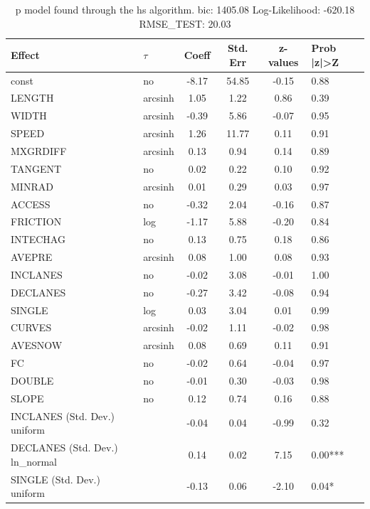 \begin{table}
	\caption{p model found through the hs algorithm. bic: 1405.08 Log-Likelihood: -620.18 RMSE_TEST: 20.03}
	\begin{center}
		\begin{tabular}{|l|l|c|c|c|l|}
			\hline
			Effect & $\tau$ & Coeff & Std. Err & z-values & Prob |z|>Z \\
			\hline
			const & no & -8.17 & 54.85 & -0.15 & 0.88 \\
			\hline
			LENGTH & arcsinh & 1.05 & 1.22 & 0.86 & 0.39 \\
			\hline
			WIDTH & arcsinh & -0.39 & 5.86 & -0.07 & 0.95 \\
			\hline
			SPEED & arcsinh & 1.26 & 11.77 & 0.11 & 0.91 \\
			\hline
			MXGRDIFF & arcsinh & 0.13 & 0.94 & 0.14 & 0.89 \\
			\hline
			TANGENT & no & 0.02 & 0.22 & 0.10 & 0.92 \\
			\hline
			MINRAD & arcsinh & 0.01 & 0.29 & 0.03 & 0.97 \\
			\hline
			ACCESS & no & -0.32 & 2.04 & -0.16 & 0.87 \\
			\hline
			FRICTION & log & -1.17 & 5.88 & -0.20 & 0.84 \\
			\hline
			INTECHAG & no & 0.13 & 0.75 & 0.18 & 0.86 \\
			\hline
			AVEPRE & arcsinh & 0.08 & 1.00 & 0.08 & 0.93 \\
			\hline
			INCLANES & no & -0.02 & 3.08 & -0.01 & 1.00 \\
			\hline
			DECLANES & no & -0.27 & 3.42 & -0.08 & 0.94 \\
			\hline
			SINGLE & log & 0.03 & 3.04 & 0.01 & 0.99 \\
			\hline
			CURVES & arcsinh & -0.02 & 1.11 & -0.02 & 0.98 \\
			\hline
			AVESNOW & arcsinh & 0.08 & 0.69 & 0.11 & 0.91 \\
			\hline
			FC & no & -0.02 & 0.64 & -0.04 & 0.97 \\
			\hline
			DOUBLE & no & -0.01 & 0.30 & -0.03 & 0.98 \\
			\hline
			SLOPE & no & 0.12 & 0.74 & 0.16 & 0.88 \\
			\hline
			INCLANES (Std. Dev.) uniform &  & -0.04 & 0.04 & -0.99 & 0.32 \\
			\hline
			DECLANES (Std. Dev.) ln_normal &  & 0.14 & 0.02 & 7.15 & 0.00*** \\
			\hline
			SINGLE (Std. Dev.) uniform &  & -0.13 & 0.06 & -2.10 & 0.04* \\

\end{tabular}
\end{center}
\end{table}
